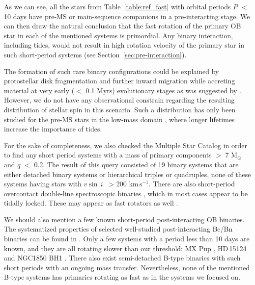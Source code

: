 \documentclass{aa}
\newcommand{\kms}{$\mathrm{km\,s^{-1}}$}
\newcommand{\vsini} {$v\sin\,i$}
\DeclareRobustCommand{\Tabref}[1]{Table~\ref{#1}}
\DeclareRobustCommand{\Secref}[1]{Section~\ref{#1}}
\begin{document}
As we can see, all the stars from \Tabref{table:ref_fast} with
orbital periods $P$ $<$ 10 days have pre-MS or main-sequence companions in a pre-interacting stage.
We can then draw the natural conclusion that the fast rotation of the
primary OB star in each of the mentioned systems is primordial.
Any binary interaction, including tides, would not result in high
rotation velocity of the primary star in such short-period systems
(see \Secref{sec:pre-interaction}).


The formation of such rare binary configurations could be explained by
protostellar disk fragmentation and further inward migration while
accreting material at very early ($<$ 0.1 Myrs) evolutionary stages as was suggested by \cite{Tokovinin_2020}. However, we do not have any
observational constrain regarding the resulting distribution of stellar spin in
this scenario. Such a distribution has only been studied for the
pre-MS stars in the low-mass domain \citep[see
e.g.,][]{Serna_2021,Kounkel_2023}, where longer lifetimes increase
the importance of tides.




For the sake of completeness, we also checked the Multiple Star Catalog \citep{Tokovinin_2018} in order to find any short period systems with a mass of primary components $>$ 7 M$_{\odot}$ and $q$ $<$ 0.2.
The result of this query consisted of 19 binary systems that are either detached binary systems or hierarchical triples or quadruples, none of these systems having stars with \vsini~ > 200 \kms.
There are also short-period overcontact double-line spectroscopic
binaries \citep[see, e.g.][]{Abdul_Masih_2022}, which in most cases
appear to be tidally locked. These may appear as fast rotators as
well \citep[for example MY Cam and CC Cas, see][respectively]{Lorenzo_2014,Southworth_2022}.

We should also mention a few known short-period post-interacting OB binaries. The systematized properties of selected well-studied post-interacting Be/Bn binaries can be found in \citet{Harmanec_2015,Naze_2022_be,Schurman_2022, Wang_2023_stripped}.
Only a few systems with a period less than 10 days are known, and they are all rotating slower than our threshold: MX Pup \citep[\vsini~$\sim$ 120 \kms, $P$ $\sim$ 5.15 days,][]{Carrier_2002}, HD\,15124 \citep[\vsini~$\sim$ 95 \kms, $P$ $\sim$ 5.47 days, companion is a sdOB progenitor,][]{Badry_2022} and NGC1850 BH1 \citep[$P$ $\sim$ 5.04 days, which leads to \vsini~ $\sim$ 50 -- 70 \kms~ by assuming the period of ellipsoidal variability and $R$ $\sim$ 5--7 $R_{\odot}$, see][]{Badry_BH1,Saracino_2023}.
There also exist semi-detached B-type binaries with such short periods \citep[see Table 7 in][]{Harmanec_2015} with an ongoing mass transfer.
Nevertheless, none of the mentioned B-type systems has primaries rotating as fast as in the systems we focused on.
\end{document}
